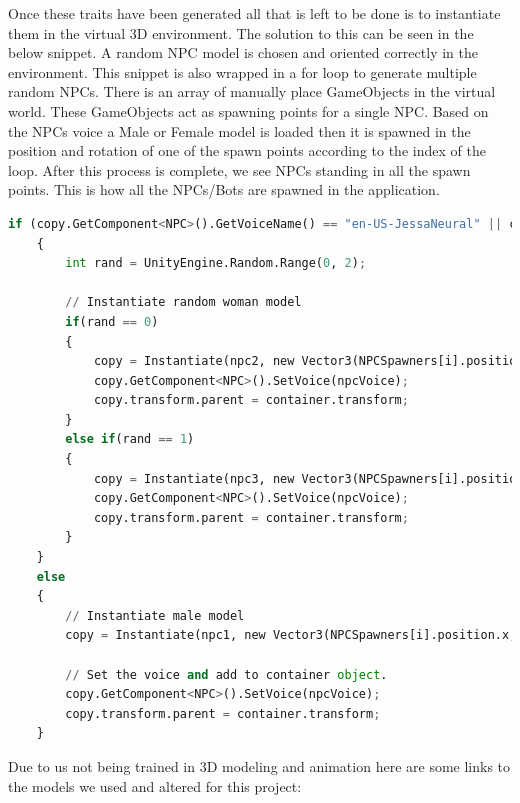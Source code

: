 \medskip
Once these traits have been generated all that is left to be done is to instantiate them in the virtual 3D environment. The solution to this can be seen in the below snippet. A random NPC model is chosen and oriented correctly in the environment.
This snippet is also wrapped in a for loop to generate multiple random NPCs. There is an array of manually place GameObjects in the virtual world. These GameObjects act as spawning points for a single NPC. Based on the NPCs voice a Male or Female model is loaded then it is spawned in the position and rotation of one of the spawn points according to the index of the loop. After this process is complete, we see NPCs standing in all the spawn points. This is how all the NPCs/Bots are spawned in the application.\newline
\newpage
\begin{lstlisting}[caption={NPC generation.},label={lst:npcs1}, language=python]
    if (copy.GetComponent<NPC>().GetVoiceName() == "en-US-JessaNeural" || copy.GetComponent<NPC>().GetVoiceName() == "de-DE-KatjaNeural")
    {
        int rand = UnityEngine.Random.Range(0, 2);

        // Instantiate random woman model
        if(rand == 0)
        {
            copy = Instantiate(npc2, new Vector3(NPCSpawners[i].position.x, NPCSpawners[i].position.y, NPCSpawners[i].position.z), Quaternion.Euler(0, NPCSpawners[i].rotation.eulerAngles.y, 0));
            copy.GetComponent<NPC>().SetVoice(npcVoice);
            copy.transform.parent = container.transform;
        }
        else if(rand == 1)
        {
            copy = Instantiate(npc3, new Vector3(NPCSpawners[i].position.x, NPCSpawners[i].position.y, NPCSpawners[i].position.z), Quaternion.Euler(0, NPCSpawners[i].rotation.eulerAngles.y, 0));
            copy.GetComponent<NPC>().SetVoice(npcVoice);
            copy.transform.parent = container.transform;
        }
    }
    else
    {
        // Instantiate male model
        copy = Instantiate(npc1, new Vector3(NPCSpawners[i].position.x, NPCSpawners[i].position.y, NPCSpawners[i].position.z), Quaternion.Euler(0, NPCSpawners[i].rotation.eulerAngles.y, 0));
        
        // Set the voice and add to container object.
        copy.GetComponent<NPC>().SetVoice(npcVoice);
        copy.transform.parent = container.transform;
    }
\end{lstlisting}

\medskip
Due to us not being trained in 3D modeling and animation here are some links to the models we used and altered for this project:

